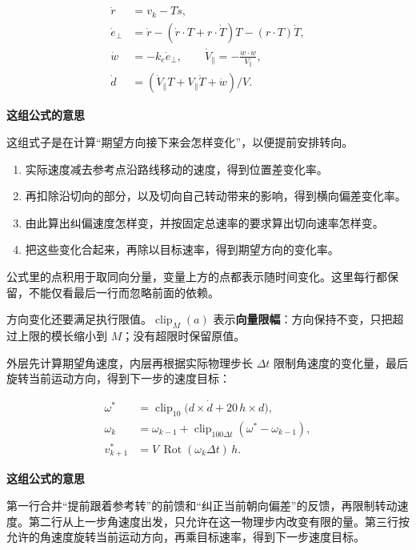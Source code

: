 \documentclass[12pt,a4paper]{article}
\numberwithin{equation}{topic}
\begin{document}
\begin{equation}
\label{eq:derivatives}
\begin{aligned}
\dot r&=v_k-T\dot s,\\
\dot e_\perp&=\dot r-
    (\dot r\cdot T+r\cdot\dot T)T-(r\cdot T)\dot T,\\
\dot w&=-k_e\dot e_\perp,\qquad
\dot V_\parallel=-\frac{w\cdot\dot w}{V_\parallel},\\
\dot d&=(\dot V_\parallel T+V_\parallel\dot T+\dot w)/V.
\end{aligned}
\end{equation}

\noindent\textbf{这组公式的意思}\par\nobreak
这组式子是在计算“期望方向接下来会怎样变化”，以便提前安排转向。
\begin{enumerate}
\item 实际速度减去参考点沿路线移动的速度，得到位置差变化率。
\item 再扣除沿切向的部分，以及切向自己转动带来的影响，得到横向偏差变化率。
\item 由此算出纠偏速度怎样变，并按固定总速率的要求算出切向速率怎样变。
\item 把这些变化合起来，再除以目标速率，得到期望方向的变化率。
\end{enumerate}
公式里的点积用于取同向分量，变量上方的点都表示随时间变化。这里每行都保留，不能仅看最后一行而忽略前面的依赖。


方向变化还要满足执行限值。\(\operatorname{clip}_M(a)\) 表示\textbf{向量限幅}：方向保持不变，只把超过上限的模长缩小到 \(M\)；没有超限时保留原值。

外层先计算期望角速度，内层再根据实际物理步长 \(\Delta t\) 限制角速度的变化量，最后旋转当前运动方向，得到下一步的速度目标：

\begin{equation}
\label{eq:rotation}
\begin{aligned}
\omega^*&=\operatorname{clip}_{10}\bigl(d\times\dot d
                   +20\,h\times d\bigr),\\
\omega_k&=\omega_{k-1}
       +\operatorname{clip}_{100\Delta t}(\omega^*-\omega_{k-1}),\\
v^*_{k+1}&=V\,\operatorname{Rot}(\omega_k\Delta t)\,h.
\end{aligned}
\end{equation}

\noindent\textbf{这组公式的意思}\par\nobreak
第一行合并“提前跟着参考转”的前馈和“纠正当前朝向偏差”的反馈，再限制转动速度。第二行从上一步角速度出发，只允许在这一物理步内改变有限的量。第三行按允许的角速度旋转当前运动方向，再乘目标速率，得到下一步速度目标。
\end{document}
